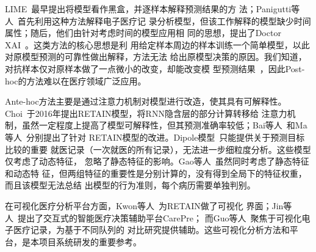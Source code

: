 LIME~最早提出将模型看作黑盒，并逐样本解释预测结果的方
法；Panigutti等人~首先利用这种方法解释电子医疗记
录分析模型，但该工作解释的模型缺少时间属性；随后，他们由针对考虑时间的模型应用相
同的思想，提出了Doctor XAI~。这类方法的核心思想是利
用给定样本周边的样本训练一个简单模型，以此对原模型预测的可靠性做出解释，方法无法
给出原模型决策的原因。我们知道，对抗样本仅对原样本做了一点微小的改变，却能改变模
型预测结果~，因此Post-hoc的方法难以在医疗领域广泛应用。

Ante-hoc方法主要是通过注意力机制对模型进行改造，使其具有可解释性。
Choi~于2016年提出RETAIN模型，将RNN隐含层的部分计算转移给
注意力机制，虽然一定程度上提高了模型可解释性，但其预测准确率较低；Bai等人~和Ma等人~分别提出了针对
RETAIN模型的改进。Dipole模型~只能提供关于预测目标比较的重要
就医记录（一次就医的所有记录），无法进一步细粒度分析。这些模型仅考虑了动态特征，
忽略了静态特征的影响。Gao等人~虽然同时考虑了静态特征和动态特
征，但两组特征的重要性是分别计算的，没有得到全局下的特征权重，而且该模型无法总结
出模型的行为准则，每个病历需要单独判别。

在可视化医疗分析平台方面，Kwon等人~为RETAIN做了可视化
界面；Jin等人~提出了交互式的智能医疗决策辅助平台CarePre；
而Guo等人~聚焦于可视化电子医疗记录，为基于不同队列的
对比研究提供辅助。这些可视化分析方法和平台，是本项目系统研发的重要参考。



{}

\begin{spacing}{1.3} %
	 \songti
	
	
	\vspace{11bp}
\end{spacing}
